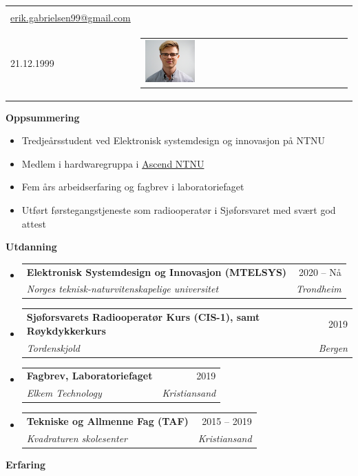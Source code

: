 \documentclass[letterpaper,12pt]{article}[leftmargin=*]
\makeatletter
\def \fullname {Erik Gabrielsen}
\def \subtitle {}
\def \linkedinicon {\faLinkedin}
\def \linkedinlink {https://linkedin.com/in/dwight-schrute/}
\def \linkedintext {/dwight-schrute}
\def \phoneicon {\faPhone}
\def \phonetext {+47 960 45 058}
\def \emailicon {\faEnvelope}
\def \emaillink {mailto:erik.gabrielsen99@gmail.com}
\def \emailtext {erik.gabrielsen99@gmail.com}
\def \githubicon {\faGithub}
\def \githublink {https://github.com/dwight-schrute}
\def \githubtext {/dwight-schrute}
\def \websiteicon {\faGlobe}
\def \websitelink {https://google.com/}
\def \websitetext {dwightschrute.com}
\def \locationicon {\faMapMarker}
\def \locationtext {Østre Moholt-tun 6, 7050 Trondheim}
\def \headertype {\headerphoto} %
\def \entryspacing {-0pt}
\def \linkedin {\linkedinicon \hspace{3pt}\href{\linkedinlink}{\linkedintext}}
\def \phone {\phoneicon \hspace{3pt}{ \phonetext}}
\def \email {\emailicon \hspace{3pt}\href{\emaillink}{\emailtext}}
\def \github {\githubicon \hspace{3pt}\href{\githublink}{\githubtext}}
\def \website {\websiteicon \hspace{3pt}\href{\websitelink}{\websitetext}}
\def \location {\locationicon \hspace{3pt}{\locationtext} }
\renewcommand{\section}[2]{\vspace{5pt}
  \colorbox{secondary}{\color{white}\raggedbottom\normalsize\textbf{{#1}{\hspace{7pt}#2}}}
}
\newcommand{\resumeEntryStart}{\begin{itemize}[leftmargin=2.5mm]}
\newcommand{\resumeEntryEnd}{\end{itemize}\vspace{\entryspacing}}
\newcommand{\resumeItemListStart}{\begin{itemize}[leftmargin=4.5mm]}
\newcommand{\resumeItemListEnd}{\end{itemize}}
\newcommand{\resumeItem}[1]{
  \item\small{
    {#1 \vspace{-2pt}}
  }
}
\newcommand{\resumeEntryTSDL}[4]{
  \vspace{-1pt}\item[]
    \begin{tabularx}{0.97\textwidth}{X@{\hspace{60pt}}r}
      \textbf{\color{primary}#1} & {\firabook\color{accent}\small#2} \\
      \textit{\color{accent}\small#3} & \textit{\color{accent}\small#4} \\
    \end{tabularx}\vspace{-6pt}
}
\newcommand{\doublecol}[6]{
  \begin{tabularx}{\textwidth}{Xr}
    {
      \begin{tabular}[c]{l}
        \fontsize{35}{45}\selectfont{\color{primary}{{\textbf{\fullname}}}} \\
        {\textit{\subtitle}} %
      \end{tabular}
    } & {
      \begin{tabular}[c]{l@{\hspace{1.5em}}l}
        {\small#4} & {\small#1} \\
        {\small#5} & {\small#2} \\
        {\small#6} & {\small#3}
      \end{tabular}
    }
  \end{tabularx}
}
\newcommand{\singlecol}[6]{
  \begin{tabularx}{\textwidth}{Xr}
    {
      \begin{tabular}[b]{l}
        \fontsize{35}{45}\selectfont{\color{primary}{{\textbf{\fullname}}}} \\
        {\textit{\subtitle}} %
      \end{tabular}
    } & {
      \begin{tabular}[c]{l}
        {\small#1} \\
        {\small#2} \\
        {\small#3} \\
        {\small#4} \\
        {\small#5} \\
        {\small#6}
      \end{tabular}
    }
  \end{tabularx}
}
\newcommand{\headerphoto}[6]{
\begin{tabularx}{\textwidth}{Xr}
    {
      \begin{tabular}[b]{l}
        \fontsize{35}{45}\selectfont{\color{primary}{{\textbf{\fullname}}}} \\
        {\small#4 \quad \small#5} \\
        {\small \faBirthdayCake \hspace{3pt}21.12.1999 \quad \small \location}
      \end{tabular}
    } & {
      \begin{tabular}{l}
        \includegraphics[width = 0.25\textwidth]{profilePic_smaller.jpg}
      \end{tabular}
    }
  \end{tabularx}
}
\makeatother
\begin{document}


\headertype{\linkedin}{\github}{\website}{\phone}{\email}{} %
\vspace{-40pt} %

\section{\faInfo}{Oppsummering}

\resumeEntryStart
\resumeItemListStart
      \resumeItem {Tredjeårsstudent ved Elektronisk systemdesign og innovasjon på NTNU}
      \resumeItem {Medlem i hardwaregruppa i \href{https://ascendntnu.no/}{Ascend NTNU} }
      \resumeItem{Fem års arbeidserfaring og fagbrev i laboratoriefaget}
      \resumeItem{Utført førstegangstjeneste som radiooperatør i Sjøforsvaret med svært god attest}

    \resumeItemListEnd
\resumeEntryEnd


\section{\faGraduationCap}{Utdanning}

  \resumeEntryStart
    \resumeEntryTSDL
      {Elektronisk Systemdesign og Innovasjon \normalfont(MTELSYS)}{2020 -- Nå}
      {Norges teknisk-naturvitenskapelige universitet}{Trondheim}
    
    \resumeEntryTSDL
    {Sjøforsvarets Radiooperatør Kurs {\normalfont(CIS-1), samt} Røykdykkerkurs}{2019}
    {Tordenskjold}{Bergen}
    
    \resumeEntryTSDL
    {Fagbrev, Laboratoriefaget}{2019}
    {Elkem Technology}{Kristiansand}
    
    \resumeEntryTSDL
    {Tekniske og Allmenne Fag \normalfont(TAF)}{2015 -- 2019}
    {Kvadraturen skolesenter}{Kristiansand}
    
  \resumeEntryEnd

\section{\faSuitcase}{Erfaring}
\end{document}
